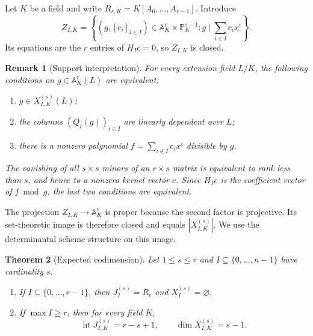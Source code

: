 \documentclass[10pt,fleqn]{article}
\numberwithin{equation}{section}
\newtheorem{theorem}{Theorem}[section]
\newtheorem{remark}[theorem]{Remark}
\newcommand{\A}{\mathbb A}
\newcommand{\PP}{\mathbb P}
\begin{document}
Let $K$ be a field and write $R_{r,K}=K[A_0,\ldots,A_{r-1}]$.  Introduce
\begin{equation}\label{eq:incidence}
 Z_{I,K}=
 \left\{(g,[c_i]_{i\in I})\in\A_K^r\times\PP_K^{s-1}:
 g\mid\sum_{i\in I}c_ix^i\right\}.
\end{equation}
Its equations are the $r$ entries of $H_Ic=0$, so $Z_{I,K}$ is closed.

\begin{remark}[Support interpretation]\label{prop:support-interpretation}
For every extension field $L/K$, the following conditions on $g\in\A_K^r(L)$ are equivalent:
\begin{enumerate}[label=\textup{(\roman*)}]
\item $g\in X_{I,K}^{(s)}(L)$;
\item the columns $(Q_i(g))_{i\in I}$ are linearly dependent over $L$;
\item there is a nonzero polynomial $f=\sum_{i\in I}c_ix^i$ divisible by $g$.
\end{enumerate}

The vanishing of all $s\times s$ minors of an $r\times s$ matrix is equivalent to rank less
than $s$, and hence to a nonzero kernel vector $c$.  Since $H_Ic$ is the coefficient vector of
$f\bmod g$, the last two conditions are equivalent.
\end{remark}

The projection $Z_{I,K}\to\A_K^r$ is proper because the second factor is projective.  Its
set-theoretic image is therefore closed and equals $|X_{I,K}^{(s)}|$.  We use the determinantal
scheme structure on this image.


\begin{theorem}[Expected codimension]\label{thm:expected-codimension}
Let $1\le s\le r$ and $I\subseteq\{0,\ldots,n-1\}$ have cardinality $s$.
\begin{enumerate}[label=\textup{(\roman*)}]
\item If $I\subseteq\{0,\ldots,r-1\}$, then $J_I^{(s)}=R_r$ and $X_I^{(s)}=\varnothing$.
\item If $\max I\ge r$, then for every field $K$,
\begin{equation}\label{eq:expected-codimension}
 \operatorname{ht}J_{I,K}^{(s)}=r-s+1,
 \qquad \dim X_{I,K}^{(s)}=s-1.
\end{equation}
\end{enumerate}
\end{theorem}
\end{document}
